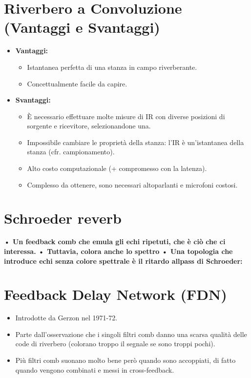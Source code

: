 \section{Riverbero a Convoluzione (Vantaggi e Svantaggi)}

\begin{itemize}
    \item \textbf{Vantaggi:}
    \begin{itemize}
        \item Istantanea perfetta di una stanza in campo riverberante.
        \item Concettualmente facile da capire.
    \end{itemize}
    
    \item \textbf{Svantaggi:}
    \begin{itemize}
        \item È necessario effettuare molte misure di IR con diverse posizioni di sorgente e ricevitore, selezionandone una.
        \item Impossibile cambiare le proprietà della stanza: l'IR è un'istantanea della stanza (cfr. campionamento).
        \item Alto costo computazionale (+ compromesso con la latenza).
        \item Complesso da ottenere, sono necessari altoparlanti e microfoni costosi.
    \end{itemize}
\end{itemize}


\section{Schroeder reverb}
\textbf{• Un feedback comb che emula gli echi ripetuti, che è ciò che ci interessa.}
\textbf{• Tuttavia, colora anche lo spettro}
\textbf{• Una topologia che introduce echi senza colore spettrale è il ritardo allpass di Schroeder:}

\section{Feedback Delay Network (FDN)}

\begin{itemize}
    \item Introdotte da Gerzon nel 1971-72.
    \item Parte dall'osservazione che i singoli filtri comb danno una scarsa qualità delle code di riverbero (colorano troppo il segnale se sono troppi pochi).
    \item Più filtri comb suonano molto bene però quando sono accoppiati, di fatto quando vengono combinati e messi in cross-feedback.
\end{itemize}

